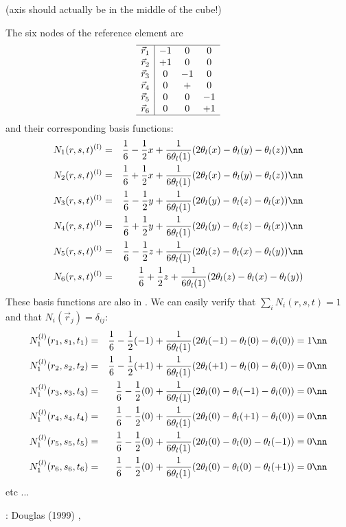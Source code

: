 

(axis should actually be in the middle of the cube!)

The six nodes of the reference element are 
\[
\begin{array}{c|ccc}
\hline
\vec{r}_1 &-1 &0 &0 \\
\vec{r}_2 &+1 &0 &0 \\
\vec{r}_3 &0 &-1 &0 \\
\vec{r}_4 &0 &+ &0 \\
\vec{r}_5 &0 &0 &-1 \\
\vec{r}_6 &0 &0 &+1 \\
\hline
\end{array}
\]
and their corresponding basis functions:
\begin{eqnarray}
N_1(r,s,t)^{(l)} &=&  \frac16 - \frac12 x + \frac{1}{6\theta_l(1)}(2\theta_l(x)-\theta_l(y)-\theta_l(z))  \nn\\
N_2(r,s,t)^{(l)} &=&  \frac16 + \frac12 x + \frac{1}{6\theta_l(1)}(2\theta_l(x)-\theta_l(y)-\theta_l(z))  \nn\\
N_3(r,s,t)^{(l)} &=&  \frac16 - \frac12 y + \frac{1}{6\theta_l(1)}(2\theta_l(y)-\theta_l(z)-\theta_l(x))  \nn\\
N_4(r,s,t)^{(l)} &=&  \frac16 + \frac12 y + \frac{1}{6\theta_l(1)}(2\theta_l(y)-\theta_l(z)-\theta_l(x))  \nn\\
N_5(r,s,t)^{(l)} &=&  \frac16 - \frac12 z + \frac{1}{6\theta_l(1)}(2\theta_l(z)-\theta_l(x)-\theta_l(y))  \nn\\
N_6(r,s,t)^{(l)} &=&  \frac16 + \frac12 z + \frac{1}{6\theta_l(1)}(2\theta_l(z)-\theta_l(x)-\theta_l(y))  
\end{eqnarray}
These basis functions are also in \cite{doss99}.
We can easily verify that $\sum_i N_i(r,s,t)=1$ and that $N_i(\vec{r}_j)=\delta_{ij}$:
\begin{eqnarray}
N_1^{(l)}(r_1,s_1,t_1) 
&=& \frac16 - \frac12 (-1) + \frac{1}{6\theta_l(1)}(2\theta_l(-1)-\theta_l(0) -\theta_l(0)) = 1 \nn\\ 
N_1^{(l)}(r_2,s_2,t_2) 
&=& \frac16 - \frac12 (+1) + \frac{1}{6\theta_l(1)}(2\theta_l(+1)-\theta_l(0) -\theta_l(0)) = 0 \nn\\ 
N_1^{(l)}(r_3,s_3,t_3) 
&=& \frac16 - \frac12 (0)  + \frac{1}{6\theta_l(1)}(2\theta_l(0) -\theta_l(-1)-\theta_l(0)) = 0 \nn\\ 
N_1^{(l)}(r_4,s_4,t_4) 
&=& \frac16 - \frac12 (0)  + \frac{1}{6\theta_l(1)}(2\theta_l(0) -\theta_l(+1)-\theta_l(0)) = 0\nn\\ 
N_1^{(l)}(r_5,s_5,t_5) 
&=& \frac16 - \frac12 (0)  + \frac{1}{6\theta_l(1)}(2\theta_l(0) -\theta_l(0) -\theta_l(-1)) = 0\nn\\ 
N_1^{(l)}(r_6,s_6,t_6) 
&=& \frac16 - \frac12 (0)  + \frac{1}{6\theta_l(1)}(2\theta_l(0) -\theta_l(0) -\theta_l(+1))  = 0\nn
\end{eqnarray}
etc ...


\Literature: Douglas \etal (1999) \cite{doss99}, 
